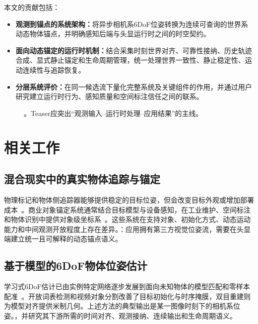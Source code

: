 \documentclass[review]{vgtc}
\newcommand{\system}{EgoAnchor}
\begin{document}
本文的贡献包括：
\begin{itemize}[leftmargin=*]
  \item \textbf{观测到锚点的系统架构：}将异步相机系6DoF位姿转换为连续可查询的世界系动态物体锚点，并明确感知后端与头显运行时之间的时空契约。
  \item \textbf{面向动态锚定的运行时机制：}结合采集时刻世界对齐、可靠性接纳、历史轨迹合成、显式静止锚定和生命周期管理，统一处理世界一致性、静止稳定性、运动连续性与追踪恢复。
  \item \textbf{分层系统评价：}在同一候选流下量化完整系统及关键组件的作用，并通过用户研究建立运行时行为、感知质量和空间标注信任之间的联系。
\end{itemize}

\begin{figure}[t]
\centering
{}
\caption{。Teaser应突出“观测输入--运行时处理--应用结果”的主线。}
\label{fig:teaser}
\end{figure}

\section{相关工作}

\subsection{混合现实中的真实物体追踪与锚定}
物理标记和物体侧追踪器能够提供稳定的目标位姿，但会改变目标外观或增加部署成本~\cite{kato1999artoolkit,olson2011apriltag,garridojurado2014aruco}。商业对象锚定系统通常结合目标模型与设备感知，在工业维护、空间标注和物体识别中提供对象级坐标系~\cite{appleObjectAnchor,azureObjectAnchors,vuforiaModelTargets,metaDynamicObjectTracker}。这些系统在支持对象、初始化方式、动态运动能力和中间观测开放程度上存在差异。：应用拥有第三方视觉位姿流，需要在头显端建立统一且可解释的动态锚点语义。

\subsection{基于模型的6DoF物体位姿估计}
学习式6DoF估计已由实例特定网络逐步发展到面向未知物体的模型匹配和零样本配准~\cite{posecnn2017,densefusion2019,cosypose2020,megapose2022,foundationpose2023}。开放词表检测和视频对象分割改善了目标初始化与时序掩膜，双目重建则为模型对齐提供米制几何。上述方法的典型输出是某一图像时刻下的相机系位姿。，并研究其下游所需的时间对齐、观测接纳、连续输出和生命周期语义。
\end{document}
